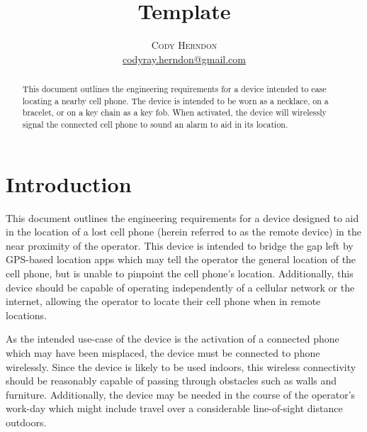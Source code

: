 \documentclass[twoside]{article}
\title{\vspace{-15mm}\fontsize{24pt}{10pt}\selectfont\textbf{Template}} %
\author{
\large
\textsc{Cody Herndon}\\[2mm] %
\normalsize \href{mailto:codyray.herndon@gmail.com}{codyray.herndon@gmail.com} %
\vspace{-5mm}
}
\date{}
\begin{document}
\maketitle %

\thispagestyle{fancy} %


\begin{abstract}

\noindent This document outlines the engineering requirements for a device intended to ease locating a nearby cell phone.  The device is intended to be worn as a necklace, on a bracelet, or on a key chain as a key fob.  When activated, the device will wirelessly signal the connected cell phone to sound an alarm to aid in its location.

\end{abstract}


\section{Introduction}

This document outlines the engineering requirements for a device designed to aid in the location of a lost cell phone (herein referred to as the remote device) in the near proximity of the operator.  This device is intended to bridge the gap left by GPS-based location apps which may tell the operator the general location of the cell phone, but is unable to pinpoint the cell phone's location.  Additionally, this device should be capable of operating independently of a cellular network or the internet, allowing the operator to locate their cell phone when in remote locations.

As the intended use-case of the device is the activation of a connected phone which may have been misplaced, the device must be connected to phone wirelessly.  Since the device is likely to be used indoors, this wireless connectivity should be reasonably capable of passing through obstacles such as walls and furniture.  Additionally, the device may be needed in the course of the operator's work-day which might include travel over a considerable line-of-sight distance outdoors.
\end{document}
